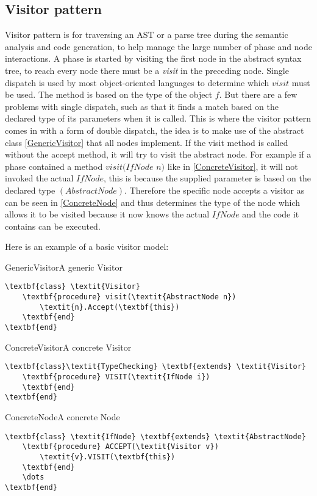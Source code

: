 \subsection{Visitor pattern}
\label{sec:VisitorPattern}
Visitor pattern is for traversing an AST or a parse tree during the semantic analysis and code generation, to help manage the large number of phase and node interactions. A phase is started by visiting the first node in the abstract syntax tree, to reach every node there must be a \textit{visit} in the preceding node.
Single dispatch is used by most object-oriented languages to determine which $visit$ must be used. The method is based on the type of the object $f$. But there are a few problems with single dispatch, such as that it finds a match based on the declared type of its parameters when it is called. This is where the visitor pattern comes in with a form of double dispatch, the idea is to make use of the abstract class \ref{GenericVisitor} that all nodes implement. If the visit method is called without the accept method, it will try to visit the abstract node. For example if a phase contained a method $visit(IfNode$ $n)$ like in \ref{ConcreteVisitor}, it will not invoked the actual $IfNode$, this is because the supplied parameter is based on the declared type $(AbstractNode)$. Therefore the specific node accepts a visitor as can be seen in \ref{ConcreteNode} and thus determines the type of the node which allows it to be visited because it now knows the actual $IfNode$ and the code it contains can be executed.

Here is an example of a basic visitor model:

\begin{code}{GenericVisitor}{A generic Visitor}
\begin{lstlisting}
\textbf{class} \textit{Visitor}
	\textbf{procedure} visit(\textit{AbstractNode n})
		\textit{n}.Accept(\textbf{this})
	\textbf{end}
\textbf{end}
\end{lstlisting}
\end{code}

\begin{code}{ConcreteVisitor}{A concrete Visitor}
\begin{lstlisting}
\textbf{class}\textit{TypeChecking} \textbf{extends} \textit{Visitor}
	\textbf{procedure} VISIT(\textit{IfNode i})
	\textbf{end}
\textbf{end}
\end{lstlisting}
\end{code}

\begin{code}{ConcreteNode}{A concrete Node}
\begin{lstlisting}
\textbf{class} \textit{IfNode} \textbf{extends} \textit{AbstractNode}
	\textbf{procedure} ACCEPT(\textit{Visitor v})
		\textit{v}.VISIT(\textbf{this})
	\textbf{end}
	\dots
\textbf{end}
\end{lstlisting}
\end{code}